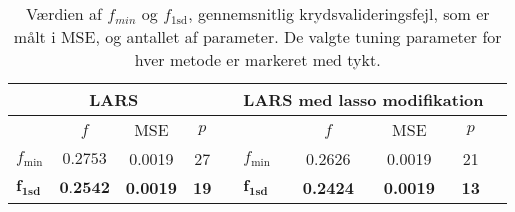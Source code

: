 \begin{table}
\center
\begin{tabular}{lcccc | lcccc}
\toprule
 \multicolumn{4}{c}{LARS} & \multicolumn{1}{c}{ }&   \multicolumn{4}{c}{LARS med lasso modifikation}  \\ \midrule
& $f$ & MSE & $p$ && & $f$ & MSE & $p$ \\
$f_{\text{min}}$ & $0.2753$ &  0.0019 & 27 && \(f_{\min}\) &  0.2626 & 0.0019 & 21   \\
$\boldsymbol{f}_{\textbf{1sd}}$ & $\textbf{0.2542} $ & \textbf{0.0019} & \textbf{19} &&$\boldsymbol{f}_{\textbf{1sd}}$ & \textbf{0.2424} & \textbf{0.0019} & \textbf{13 } \\ \bottomrule
 \end{tabular}
\caption{Værdien af $f_{min}$ og $f_{1\text{sd}}$, gennemsnitlig krydsvalideringsfejl, som er målt i MSE, og antallet af parameter. De valgte tuning parameter for hver metode er markeret med tykt.} \label{tab:lars_lasso_tab}
\end{table}
